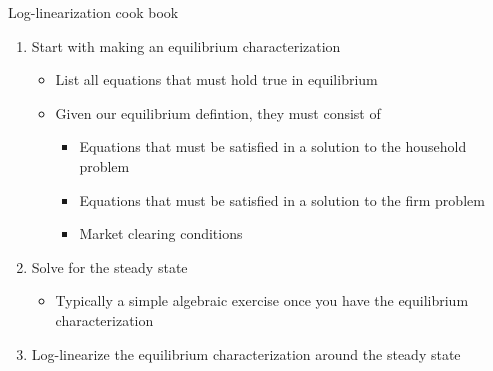 \documentclass[9pt,xcolor={dvipsnames}]{beamer}
\newcommand{\bit}{\begin{itemize}}
\newcommand{\eit}{\end{itemize}}
\newcommand{\ben}{\begin{enumerate}}
\newcommand{\een}{\end{enumerate}}
\newcommand{\bc}{\color{blue}}
\begin{document}
\begin{frame}{Log-linearization cook book}

\ben
\setlength\itemsep{1.5em}

\item Start with making an {\bc equilibrium characterization}
\bit
\setlength\itemsep{0.5em}
\item List all equations that must hold true in equilibrium

\item Given our equilibrium defintion, they must consist of
\bit
\setlength\itemsep{0.5em}
\item Equations that must be satisfied in a solution to the household problem

\item Equations that must be satisfied in a solution to the firm problem

\item Market clearing conditions
\eit

\eit

\item Solve for the {\bc steady state}
\bit
	\item Typically a simple algebraic exercise once you have the equilibrium characterization
\eit

\item {\bc Log-linearize} the {\bc equilibrium characterization} around the {\bc steady state}

\een

\end{frame}
\end{document}
